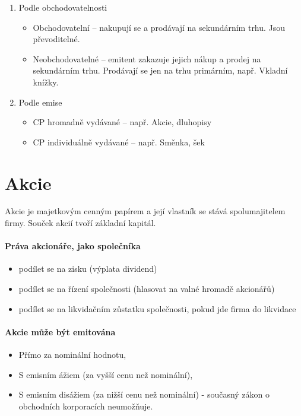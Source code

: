 \begin{enumerate}
    \item Podle obchodovatelnosti
        \begin{itemize}
            \item Obchodovatelní -- nakupují se a prodávají na sekundárním trhu. Jsou převoditelné.
            \item Neobchodovatelné -- emitent zakazuje jejich nákup a prodej na sekundárním trhu. Prodávají se jen na trhu primárním, např. Vkladní knížky.
        \end{itemize}
    \item Podle emise
        \begin{itemize}
            \item CP hromadně vydávané -- např. Akcie, dluhopisy
            \item CP individuálně vydávané -- např. Směnka, šek
        \end{itemize}
\end{enumerate}

\section*{Akcie}

Akcie je majetkovým cenným papírem a její vlastník se stává spolumajitelem firmy. Souček akcií tvoří základní kapitál.

\paragraph{Práva akcionáře, jako společníka}
\begin{itemize}
    \item podílet se na zisku (výplata dividend)
    \item podílet se na řízení společnosti (hlasovat na valné hromadě akcionářů)
    \item podílet se na likvidačním zůstatku společnosti, pokud jde firma do likvidace
\end{itemize}

\paragraph{Akcie může být emitována}
\begin{itemize}
    \item Přímo za nominální hodnotu,
    \item S emisním ážiem (za vyšší cenu než nominální),
    \item S emisním disážiem (za nižší cenu než nominální) - současný zákon o obchodních korporacích neumožňuje.
\end{itemize}

